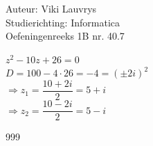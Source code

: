 \documentclass[a4paper]{article}
\begin{document}
  
\noindent \large Auteur: Viki Lauvrys        \\
\noindent \large Studierichting: Informatica \\
\noindent \large Oefeningenreeks 1B nr. 40.7 \\

\medskip

\normalsize

$ z^2 - 10z + 26 = 0 $\\

$ D = 100 - 4 \cdot 26 = -4 = (\pm 2i)^2 $\\

$\Rightarrow z_1 = \dfrac{ 10 + 2i}{2} = 5 + i $\\

$\Rightarrow z_2 = \dfrac{ 10 - 2i}{2} = 5 - i $\\

\begin{thebibliography}{999}
\end{thebibliography}
\end{document}
